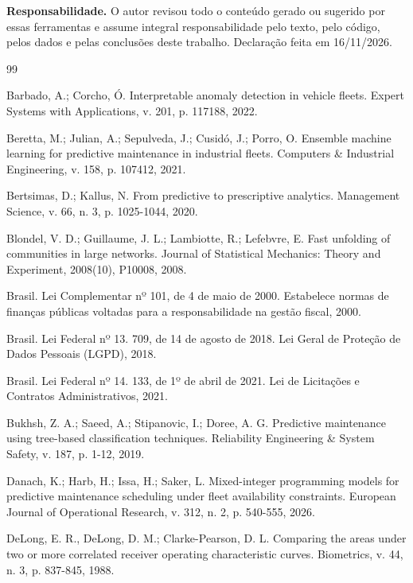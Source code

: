 \documentclass[12pt,a4paper]{article}
\begin{document}
\textbf{Responsabilidade.} O autor revisou todo o conteúdo gerado ou sugerido por essas ferramentas e assume integral responsabilidade pelo texto, pelo código, pelos dados e pelas conclusões deste trabalho. Declaração feita em 16/11/2026.


\begin{thebibliography}{99}

 Barbado, A.; Corcho, Ó. Interpretable anomaly detection in vehicle fleets. Expert Systems with Applications, v. 201, p. 117188, 2022.

 Beretta, M.; Julian, A.; Sepulveda, J.; Cusidó, J.; Porro, O. Ensemble machine learning for predictive maintenance in industrial fleets. Computers \& Industrial Engineering, v. 158, p. 107412, 2021.

 Bertsimas, D.; Kallus, N. From predictive to prescriptive analytics. Management Science, v. 66, n. 3, p. 1025-1044, 2020.

 Blondel, V. D.; Guillaume, J. L.; Lambiotte, R.; Lefebvre, E. Fast unfolding of communities in large networks. Journal of Statistical Mechanics: Theory and Experiment, 2008(10), P10008, 2008.

 Brasil. Lei Complementar nº 101, de 4 de maio de 2000. Estabelece normas de finanças públicas voltadas para a responsabilidade na gestão fiscal, 2000.

 Brasil. Lei Federal nº 13. 709, de 14 de agosto de 2018. Lei Geral de Proteção de Dados Pessoais (LGPD), 2018.

 Brasil. Lei Federal nº 14. 133, de 1º de abril de 2021. Lei de Licitações e Contratos Administrativos, 2021.

 Bukhsh, Z. A.; Saeed, A.; Stipanovic, I.; Doree, A. G. Predictive maintenance using tree-based classification techniques. Reliability Engineering \& System Safety, v. 187, p. 1-12, 2019.

 Danach, K.; Harb, H.; Issa, H.; Saker, L. Mixed-integer programming models for predictive maintenance scheduling under fleet availability constraints. European Journal of Operational Research, v. 312, n. 2, p. 540-555, 2026.

 DeLong, E. R., DeLong, D. M.; Clarke-Pearson, D. L. Comparing the areas under two or more correlated receiver operating characteristic curves. Biometrics, v. 44, n. 3, p. 837-845, 1988.


\end{thebibliography}
\end{document}
